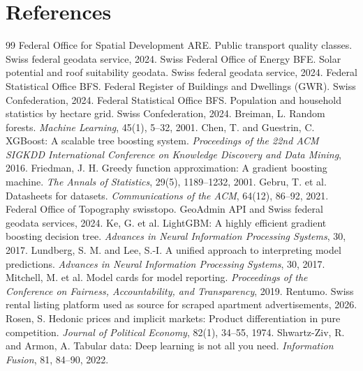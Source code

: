 \documentclass[11pt,a4paper]{article}
\begin{document}
\section{References}
\label{sec:references}


\begin{thebibliography}{99}
 Federal Office for Spatial Development ARE. Public transport quality classes. Swiss federal geodata service, 2024.
 Swiss Federal Office of Energy BFE. Solar potential and roof suitability geodata. Swiss federal geodata service, 2024.
 Federal Statistical Office BFS. Federal Register of Buildings and Dwellings (GWR). Swiss Confederation, 2024.
 Federal Statistical Office BFS. Population and household statistics by hectare grid. Swiss Confederation, 2024.
 Breiman, L. Random forests. \emph{Machine Learning}, 45(1), 5--32, 2001.
 Chen, T. and Guestrin, C. XGBoost: A scalable tree boosting system. \emph{Proceedings of the 22nd ACM SIGKDD International Conference on Knowledge Discovery and Data Mining}, 2016.
 Friedman, J. H. Greedy function approximation: A gradient boosting machine. \emph{The Annals of Statistics}, 29(5), 1189--1232, 2001.
 Gebru, T. et al. Datasheets for datasets. \emph{Communications of the ACM}, 64(12), 86--92, 2021.
 Federal Office of Topography swisstopo. GeoAdmin API and Swiss federal geodata services, 2024.
 Ke, G. et al. LightGBM: A highly efficient gradient boosting decision tree. \emph{Advances in Neural Information Processing Systems}, 30, 2017.
 Lundberg, S. M. and Lee, S.-I. A unified approach to interpreting model predictions. \emph{Advances in Neural Information Processing Systems}, 30, 2017.
 Mitchell, M. et al. Model cards for model reporting. \emph{Proceedings of the Conference on Fairness, Accountability, and Transparency}, 2019.
 Rentumo. Swiss rental listing platform used as source for scraped apartment advertisements, 2026.
 Rosen, S. Hedonic prices and implicit markets: Product differentiation in pure competition. \emph{Journal of Political Economy}, 82(1), 34--55, 1974.
 Shwartz-Ziv, R. and Armon, A. Tabular data: Deep learning is not all you need. \emph{Information Fusion}, 81, 84--90, 2022.
\end{thebibliography}
\end{document}
